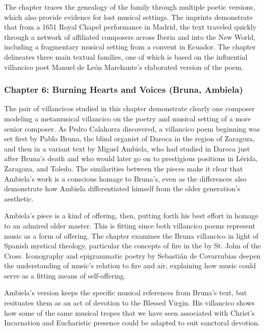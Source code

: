 \documentclass{vcbook-proposal}
\begin{document}
The chapter traces the genealogy of the  family through multiple poetic versions, which also provide evidence for lost musical settings.
The imprints demonstrate that from a 1651 Royal Chapel performance in Madrid, the text traveled quickly through a network of affiliated composers across Iberia and into the New World, including a fragmentary musical setting from a convent in Ecuador.
The chapter delineates three main textual families, one of which is based on the influential villancico poet Manuel de León Marchante's elaborated version of the poem. 

\subsubsection{Chapter 6: Burning Hearts and Voices (Bruna, Ambiela)}

The pair of villancicos studied in this chapter demonstrate clearly one composer modeling a metamusical villancico on the poetry and musical setting of a more senior composer.
As Pedro Calahorra discovered, a villancico poem beginning  was set first by Pablo Bruna, the blind organist of Daroca in the region of Zaragoza, and then in a variant text by Miguel Ambiela, who had studied in Daroca just after Bruna's death and who would later go on to prestigious positions in Lérida, Zaragoza, and Toledo.
The similarities between the pieces make it clear that Ambiela's work is a conscious homage to Bruna's, even as the differences also demonstrate how Ambiela differentiated himself from the older generation's aesthetic. 

Ambiela's piece is a kind of offering, then, putting forth his best effort in homage to an admired older master.
This is fitting since both villancico poems represent music as a form of offering.
The chapter examines the Bruna villancico in light of Spanish mystical theology, particular the concepts of fire in the  by St. John of the Cross.
Iconography and epigrammatic poetry by Sebastián de Covarrubias deepen the understanding of music's relation to fire and air, explaining how music could serve as a fitting means of self-offering.

Ambiela's version keeps the specific musical references from Bruna's text, but resituates them as an act of devotion to the Blessed Virgin.
His villancico shows how some of the same musical tropes that we have seen associated with Christ's Incarnation and Eucharistic presence could be adapted to suit sanctoral devotion. 
\end{document}
